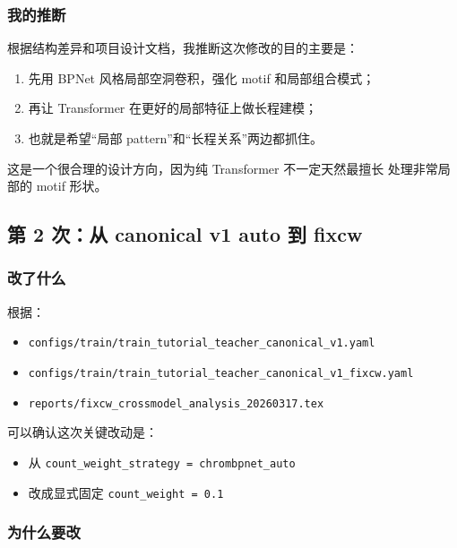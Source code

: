 \documentclass[11pt,a4paper]{ctexart}
\begin{document}
\subsubsection*{我的推断}

根据结构差异和项目设计文档，我推断这次修改的目的主要是：

\begin{enumerate}[leftmargin=2em]
\item 先用 BPNet 风格局部空洞卷积，强化 motif 和局部组合模式；
\item 再让 Transformer 在更好的局部特征上做长程建模；
\item 也就是希望“局部 pattern”和“长程关系”两边都抓住。
\end{enumerate}

这是一个很合理的设计方向，因为纯 Transformer 不一定天然最擅长
处理非常局部的 motif 形状。

\subsection{第 2 次：从 canonical v1 auto 到 fixcw}

\subsubsection*{改了什么}

根据：

\begin{itemize}[leftmargin=2em]
\item \texttt{configs/train/train\_tutorial\_teacher\_canonical\_v1.yaml}
\item \texttt{configs/train/train\_tutorial\_teacher\_canonical\_v1\_fixcw.yaml}
\item \texttt{reports/fixcw\_crossmodel\_analysis\_20260317.tex}
\end{itemize}

可以确认这次关键改动是：

\begin{itemize}[leftmargin=2em]
\item 从 \texttt{count\_weight\_strategy = chrombpnet\_auto}
\item 改成显式固定 \texttt{count\_weight = 0.1}
\end{itemize}

\subsubsection*{为什么要改}
\end{document}
